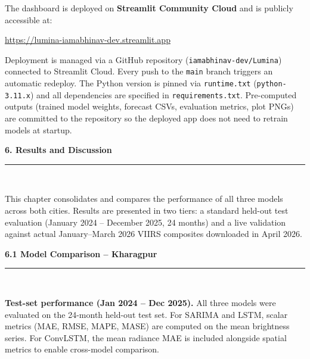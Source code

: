 \documentclass[12pt,a4paper]{report}
\begin{document}
The dashboard is deployed on \textbf{Streamlit Community Cloud} and is publicly accessible at:

\begin{center}
    \url{https://lumina-iamabhinav-dev.streamlit.app}
\end{center}

Deployment is managed via a GitHub repository (\texttt{iamabhinav-dev/Lumina}) connected to Streamlit Cloud. Every push to the \texttt{main} branch triggers an automatic redeploy. The Python version is pinned via \texttt{runtime.txt} (\texttt{python-3.11.x}) and all dependencies are specified in \texttt{requirements.txt}. Pre-computed outputs (trained model weights, forecast CSVs, evaluation metrics, plot PNGs) are committed to the repository so the deployed app does not need to retrain models at startup.

\newpage
\thispagestyle{plain}
\begin{center}
    \hypertarget{sec:ch6}{}%
    {\Large \textbf{6. Results and Discussion}}\\[0.3cm]
    \noindent\rule{\linewidth}{0.6pt}\\[0.8cm]
\end{center}
\setlength{\parindent}{1cm}
\setlength{\parskip}{6pt}
\justifying

This chapter consolidates and compares the performance of all three models across both cities. Results are presented in two tiers: a standard held-out test evaluation (January 2024 -- December 2025, 24 months) and a live validation against actual January--March 2026 VIIRS composites downloaded in April 2026.

\vspace{0.5cm}
\begin{center}
    \hypertarget{sec:s61}{}%
    {\large \textbf{6.1 Model Comparison -- Kharagpur}}\\[0.3cm]
    \noindent\rule{\linewidth}{0.4pt}\\[0.5cm]
\end{center}

\textbf{Test-set performance (Jan 2024 -- Dec 2025).} All three models were evaluated on the 24-month held-out test set. For SARIMA and LSTM, scalar metrics (MAE, RMSE, MAPE, MASE) are computed on the mean brightness series. For ConvLSTM, the mean radiance MAE is included alongside spatial metrics to enable cross-model comparison.
\end{document}
